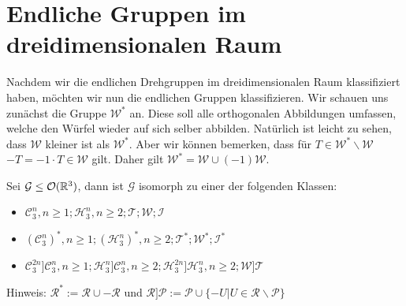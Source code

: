 \section{Endliche Gruppen im dreidimensionalen Raum} 
Nachdem wir die endlichen Drehgruppen im dreidimensionalen Raum klassifiziert haben, möchten wir nun die endlichen Gruppen klassifizieren. Wir schauen uns zunächst die Gruppe $\mathcal{W}^*$ an. Diese soll alle orthogonalen Abbildungen umfassen, welche den Würfel wieder auf sich selber abbilden. Natürlich ist leicht zu sehen, dass $\mathcal{W}$ kleiner ist als $\mathcal{W}^*$. Aber wir können bemerken, dass für $T \in \mathcal{W}^*\backslash\mathcal{W}$ \ $-T = -1 \cdot T \in \mathcal{W}$ gilt. Daher gilt $\mathcal{W}^*=\mathcal{W}\cup(-1)\mathcal{W}$.
\begin{theorem}
 Sei $\mathcal{G}\leq{\mathcal{O}(\mathbb{R}^3)}$, dann ist $\mathcal{G}$ isomorph zu einer der folgenden Klassen:
 \begin{itemize}
  \item $\mathcal{C}^n_3,n\geq1;\mathcal{H}^n_3,n\geq2;\mathcal{T};\mathcal{W};\mathcal{I}$
  \item $(\mathcal{C}^n_3)^*,n\geq1;(\mathcal{H}^n_3)^*,n\geq 2;\mathcal{T}^*;\mathcal{W}^*;\mathcal{I}^*$
  \item $\mathcal{C}^{2n}_3]\mathcal{C}^n_3,n\geq1;\mathcal{H}^n_3]\mathcal{C}^n_3,n\geq 2;\mathcal{H}^{2n}_3]\mathcal{H}^n_3,n\geq2;\mathcal{W}]\mathcal{T}$
\end{itemize}
Hinweis: $\mathcal{R}^*:=\mathcal{R}\cup -\mathcal{R}$ und $\mathcal{R}]\mathcal{P}:=\mathcal{P}\cup \{-U|U\in \mathcal{R} \backslash \mathcal{P} \}$
\end{theorem}
